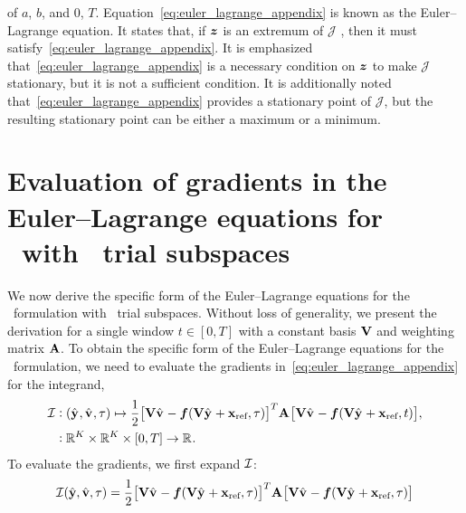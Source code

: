 \documentclass[3p,computermodern,10pt]{elsarticle}
\begin{document}
\begin{appendices}
{of $a$, $b$, and $0$, $T$.}
Equation~\eqref{eq:euler_lagrange_appendix} is known as the Euler--Lagrange
equation. It states that, if $\boldsymbol z$ is an extremum of $\mathcal{J}$
, then it must
satisfy~\eqref{eq:euler_lagrange_appendix}. It is emphasized
that~\eqref{eq:euler_lagrange_appendix} is a necessary condition on $\boldsymbol z$
to make $\mathcal{J}$ stationary, but it is not a sufficient condition. It is
additionally noted that~\eqref{eq:euler_lagrange_appendix} provides a
stationary point of $\mathcal{J}$, but the resulting stationary point can be
either a maximum or a minimum. 

\section{Evaluation of gradients in the Euler--Lagrange equations for \methodAcronym\ with \spatialAcronym\ trial subspaces}\label{appendix:vector_calc}
We now derive the specific form of the Euler--Lagrange equations for the \methodAcronym\ formulation with \spatialAcronym\ trial subspaces. Without loss of generality, we present the derivation for a single window $t \in [0,T]$ with a constant basis $\mathbf {V}$ and weighting matrix $\mathbf{A}$.  
To obtain the specific form of the Euler--Lagrange equations for the \methodAcronym\ formulation, we need to evaluate the gradients in~\eqref{eq:euler_lagrange_appendix} for the integrand,
\begin{align*}\label{eq:integrand_apx}
 \mathcal{I} & \vcentcolon
(\hat{\mathbf{y}}^{}, \hat{\mathbf{v}}^{} ,\tau) \mapsto \frac{1}{2} \big[
\mathbf {V} \hat{\mathbf{v}}^{} - \boldsymbol f(\mathbf {V} \hat{\mathbf{y}}^{}
+ \mathbf{x}_\text{ref},\tau) \big]^T \mathbf{A}^{} \big[
\mathbf {V} \hat{\mathbf{v}}^{}  - \boldsymbol f(\mathbf {V} \hat{\mathbf{y}}^{} +
\mathbf{x}_\text{ref},t) \big], \\ & 
\vcentcolon \mathbb{R}^{K} \times \mathbb{R}^{K} \times [0,T]
 \rightarrow \mathbb{R}^{} .  
\end{align*}
To evaluate the gradients, we first expand $\mathcal{I}$:
\begin{align*}
 \minintegrand(\genstateyDiscrete,\genstateyDiscreteDot,\timeDummy)  &= \frac{1}{2} \big[ \basisspace \genstateyDiscreteDotArgnt{}  - \velocity(\basisspace \genstateyDiscreteArgnt{} + \stateIntercept,\timeDummy) \big]^T \stweightingMatArg{} \big[ \basisspace \genstateyDiscreteDotArgnt{} - \velocity(\veloargsromy) \big] \\ 

\end{align*}
\end{appendices}
\end{document}
